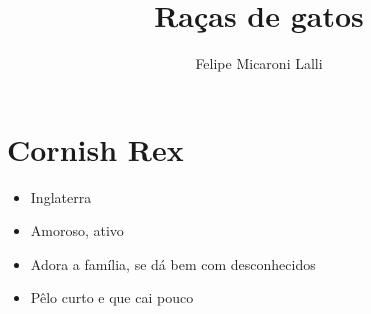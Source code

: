 \documentclass[a4paper]{article}
\title{Ra\c{c}as de gatos}
\author{Felipe Micaroni Lalli}
\begin{document}
  \maketitle

  \section{Cornish Rex}

  \begin{itemize}
    \item Inglaterra
    \item Amoroso, ativo
    \item Adora a fam\'ilia, se d\'a bem com desconhecidos
    \item P\^elo curto e que cai pouco
  \end{itemize}
\end{document}
